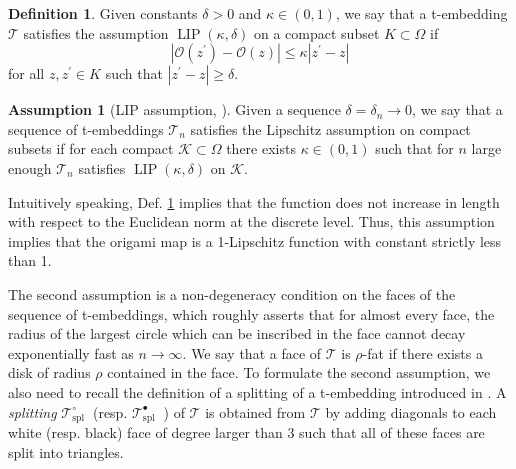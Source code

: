 \documentclass[12pt]{amsart}
\numberwithin{equation}{section}
\theoremstyle{definition}
\newtheorem{defn}[thm]{Definition}
\newtheorem{assumption}[thm]{Assumption}
\begin{document}
\begin{defn}
    \label{defn:Lipschitz_defn}
    Given constants $\delta>0$ and $\kappa \in(0,1)$, we say that a t-embedding $\mathcal{T}$ satisfies the assumption $\operatorname{LIP}(\kappa, \delta)$ on a compact subset $K \subset \Omega$ if
$$
\left|\mathcal{O}\left(z^{\prime}\right)-\mathcal{O}(z)\right| \leq \kappa\left|z^{\prime}-z\right|
$$
for all $z, z^{\prime} \in K$ such that $\left|z^{\prime}-z\right| \geq \delta$.
\end{defn}

\begin{assumption}[LIP assumption, \cite{MR4588721}]
\label{assumption:LIP}
    Given a sequence $\delta=\delta_n \rightarrow 0$, we say that a sequence of t-embeddings $\mathcal{T}_n$ satisfies the Lipschitz assumption on compact subsets if for each compact $\mathcal{K} \subset \Omega$ there exists $\kappa \in(0,1)$ such that for $n$ large enough $\mathcal{T}_n$ satisfies $\operatorname{LIP}(\kappa, \delta)$ on $\mathcal{K}$.
\end{assumption}
Intuitively speaking, Def. \ref{defn:Lipschitz_defn} implies that the function does not increase in length with respect to the Euclidean norm at the discrete level. Thus, this assumption implies that the origami map is a 1-Lipschitz function with constant strictly less than 1. 

The second assumption is a non-degeneracy condition on the faces of the sequence of t-embeddings, which roughly asserts that for almost every face, the radius of the largest circle which can be inscribed in the face cannot decay exponentially fast as $n \rightarrow \infty$. We say that a face of $\mathcal{T}$ is $\rho$-fat if there exists a disk of radius $\rho$ contained in the face. To formulate the second assumption, we also need to recall the definition of a splitting of a t-embedding introduced in \cite{MR4588721}. A \emph{splitting} $\mathcal{T}_{\text {spl }}^{\circ}$ (resp. $\mathcal{T}_{\text {spl }}^{\bullet}$ ) of $\mathcal{T}$ is obtained from $\mathcal{T}$ by adding diagonals to each white (resp. black) face of degree larger than 3 such that all of these faces are split into triangles.
\end{document}
